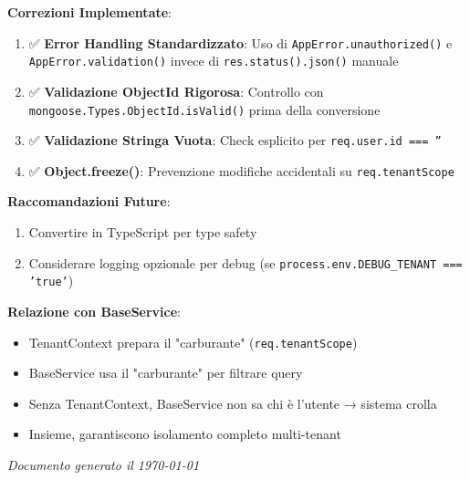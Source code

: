 \documentclass[11pt,a4paper]{article}
\begin{document}
\textbf{Correzioni Implementate}:
\begin{enumerate}
    \item ✅ \textbf{Error Handling Standardizzato}: Uso di \texttt{AppError.unauthorized()} e \texttt{AppError.validation()} invece di \texttt{res.status().json()} manuale
    \item ✅ \textbf{Validazione ObjectId Rigorosa}: Controllo con \texttt{mongoose.Types.ObjectId.isValid()} prima della conversione
    \item ✅ \textbf{Validazione Stringa Vuota}: Check esplicito per \texttt{req.user.id === ''}
    \item ✅ \textbf{Object.freeze()}: Prevenzione modifiche accidentali su \texttt{req.tenantScope}
\end{enumerate}

\textbf{Raccomandazioni Future}:
\begin{enumerate}
    \item Convertire in TypeScript per type safety
    \item Considerare logging opzionale per debug (se \texttt{process.env.DEBUG\_TENANT === 'true'})
\end{enumerate}

\textbf{Relazione con BaseService}:
\begin{itemize}
    \item TenantContext prepara il "carburante" (\texttt{req.tenantScope})
    \item BaseService usa il "carburante" per filtrare query
    \item Senza TenantContext, BaseService non sa chi è l'utente → sistema crolla
    \item Insieme, garantiscono isolamento completo multi-tenant
\end{itemize}

\vspace{1cm}

\textit{Documento generato il \today}
\end{document}
